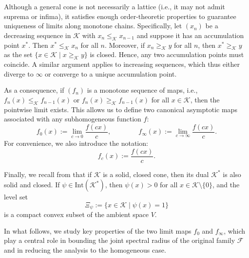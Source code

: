 \documentclass{article}
\newcommand{\family}{\mathcal{F}}
\newcommand{\cone}{\mathcal{K}}
\newcommand{\interior}{\mathrm{Int}}
\newcommand{\cgeq}{\geq_{\cone}}
\newcommand{\cleq}{\leq_{\cone}}
\begin{document}
Although a general cone is not necessarily a lattice (i.e., it may not admit suprema or infima), it satisfies enough order-theoretic properties to guarantee uniqueness of limits along monotone chains. Specifically, let $(x_n)$ be a decreasing sequence in $\cone$ with $x_n \cleq x_{n-1}$ and suppose it has an accumulation point $x^*$. Then $x^* \cleq x_n$ for all $n$. Moreover, if $x_n \cgeq y$ for all $n$, then $x^* \cgeq y$ as the set $\{x \in \cone \mid x \cgeq y\}$ is closed. Hence, any two accumulation points must coincide. A similar argument applies to increasing sequences, which thus either diverge to $\infty$ or converge to a unique accumulation point. 

As a consequence, if $(f_n)$ is a monotone sequence of maps, i.e., $f_n(x) \cleq f_{n-1}(x)$ or $f_n(x) \cgeq f_{n-1}(x)$ for all $x \in \cone$, then the pointwise limit exists. This allows us to define two canonical asymptotic maps associated with any subhomogeneous function $f$:
\begin{equation}\label{Def_f_0 and f_inf}
    f_0(x) := \lim_{c \to 0} \frac{f(c x)}{c}, \qquad \qquad
    f_{\infty}(x) := \lim_{c \to \infty} \frac{f(c x)}{c}.
\end{equation}
For convenience, we also introduce the notation:
\begin{equation}
    f_c(x) := \frac{f(c x)}{c}.
\end{equation}

Finally, we recall from \cite{lemmens2012nonlinear} that if $\cone$ is a solid, closed cone, then its dual $\cone^*$ is also solid and closed. If $\psi \in \interior(\cone^*)$, then $\psi(x) > 0$ for all $x \in \cone \setminus \{0\}$, and the level set
\begin{equation}
    \Xi_{\psi} := \{x \in \cone \mid \psi(x) = 1\}
\end{equation}
is a compact convex subset of the ambient space $V$.

In what follows, we study key properties of the two limit maps $f_0$ and $f_\infty$, which play a central role in bounding the joint spectral radius of the original family $\family$ and in reducing the analysis to the homogeneous case.
\end{document}
